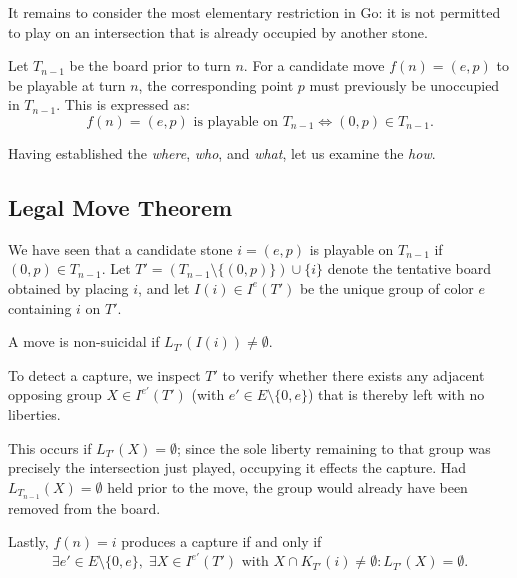It remains to consider the most elementary restriction in Go: it is not permitted to play on an intersection that is already occupied by another stone.

\begin{definition}
	Let $T_{n-1}$ be the board prior to turn $n$. For a candidate move $f(n) =(e, p)$ to be playable at turn $n$, the corresponding point $p$ must previously be unoccupied in $T_{n-1}$. This is expressed as:
	$$f(n) = (e, p) \text{ is playable on } T_{n-1} \iff (0, p) \in T_{n-1}.$$
	\end{definition}

Having established the \textit{where}, \textit{who}, and \textit{what}, let us examine the \textit{how}.

\subsection{Legal Move Theorem}

We have seen that a candidate stone $i = (e, p)$ is playable on $T_{n-1}$ if $(0, p) \in T_{n-1}$.
Let $T' = (T_{n-1} \setminus \{(0, p)\}) \cup \{i\}$ denote the tentative board obtained by placing $i$, and let $I(i) \in I^e(T')$ be the unique group of color $e$ containing $i$ on $T'$.

A move is non-suicidal if $L_{T'}(I(i)) \neq \emptyset$.

To detect a capture, we inspect $T'$ to verify whether there exists any adjacent opposing group $X \in I^{e'}(T')$ (with $e' \in E \setminus \{0, e\}$) that is thereby left with no liberties. 

This occurs if $L_{T'}(X) = \emptyset$; since the sole liberty remaining to that group was precisely the intersection just played, occupying it effects the capture. Had $L_{T_{n-1}}(X) = \emptyset$ held prior to the move, the group would already have been removed from the board.

Lastly, $f(n) = i$ produces a capture if and only if
\[
\exists e' \in E \setminus \{0, e\}, \; \exists X \in I^{e'}(T') \text{ with } X \cap K_{T'}(i) \neq \emptyset : L_{T'}(X) = \emptyset.
\]

